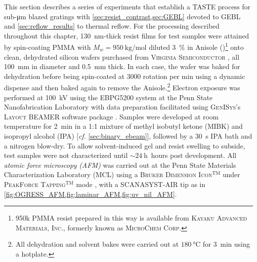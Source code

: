 This section describes a series of experiments that establish a TASTE process for sub-\si{\um} blazed gratings \cite{McCoy18} with \cref{sec:resist_contrast,sec:GEBL} devoted to GEBL and \cref{sec:reflow_results} to thermal reflow. 
For the processing described throughout this chapter, \SI{130}{\nm}-thick resist films for test samples were attained by spin-coating PMMA with $M_w = \SI{950}{\kilogram\per\mole}$ diluted \SI{3}{\percent} in Anisole ()\footnote{950k PMMA resist prepared in this way is available from \textsc{Kayaku Advanced Materials, Inc.}, formerly known as \textsc{MicroChem Corp.}} onto clean, dehydrated silicon wafers purchased from \textsc{Virginia Semiconductor} \cite{Virgsemi_web}, all \SI{100}{\mm} in diameter and \SI{0.5}{\mm} thick. %
In each case, the wafer was baked for dehydration before being spin-coated at \num{3000} rotation per \si{\minute} using a dynamic dispense and then baked again to remove the Anisole.\footnote{All dehydration and solvent bakes were carried out at $\SI{180}{\celsius}$ for \SI{3}{\minute} using a hotplate.}  
Electron exposure was performed at \SI{100}{\kilo\volt} using the \textsc{EBPG5200} system at the Penn State Nanofabrication Laboratory \cite[\emph{cf.\@} \cref{fig:ebeam_tool_pic}]{PSU_MRI_nanofab,PSU_MRI_EBL,raith_ebpg} with data preparation facilitated using \textsc{GenISys}'s \textsc{Layout BEAMER} software package \cite{beamer}.  
Samples were developed at room temperature for \SI{2}{\minute} in a 1:1 mixture of methyl isobutyl ketone (MIBK) and isopropyl alcohol (IPA) [\emph{cf.\@} \cref{sec:binary_ebeam}], followed by a \SI{30}{\second} IPA bath and a nitrogen blow-dry. 
To allow solvent-induced gel and resist swelling to subside, test samples were not characterized until $\sim \SI{24}{\hour}$ hours post development. 
All \emph{atomic force microscopy (AFM)} was carried out at the Penn State Materials Characterization Laboratory (MCL) \cite{PSU_MRI_CL} using a \textsc{Bruker Dimension Icon}$^{\text{TM}}$ under \textsc{PeakForce Tapping}$^{\text{TM}}$ mode \cite{Xu18}, with a \textsc{SCANASYST-AIR} tip as in \cref{fig:OGRESS_AFM,fig:laminar_AFM,fig:uv_nil_AFM}. 

